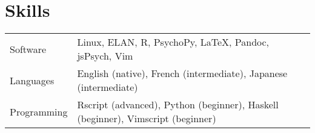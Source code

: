 \documentclass[letterpaper]{article}
\begin{document}
\section*{Skills}
\begin{tabular}{p{}p{}}
    Software &Linux, ELAN, R, PsychoPy, \LaTeX{}, Pandoc, jsPsych, Vim \\
    Languages &English (native), French (intermediate), Japanese (intermediate)
    \\
    Programming &Rscript (advanced), Python (beginner), Haskell (beginner),
    Vimscript (beginner) \\
\end{tabular}

\vfill


\end{document}
